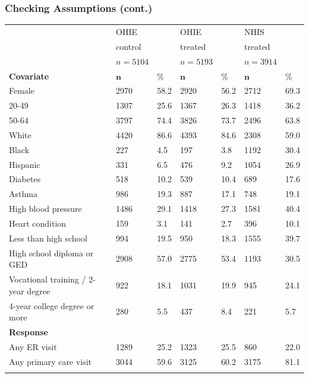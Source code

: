 \documentclass{beamer}
\begin{document}
\begin{frame}
\frametitle{Checking Assumptions (cont.)}
{\scriptsize
\begin{longtable}{lllllll}
  & OHIE &  & OHIE &  & NHIS &  \\ 
    & control &  & treated &  &treated &   \\ 
  & $n=5104$ &  & $n=5193$ &  & $n=3914$ &  \\  
  \hline   
    \hline   
 \textbf{Covariate} &  $\mathbf{n}$ & $\mathbf{\%}$ & $\mathbf{n}$ & $\mathbf{\%}$ & $\mathbf{n}$ & $\mathbf{\%}$ \\ 
\hline
Female & 2970 & 58.2 & 2920 & 56.2 & 2712 & 69.3  \\ 
   \hline
20-49 & 1307 & 25.6 & 1367 & 26.3 & 1418 & 36.2  \\ 
   \hline
50-64 & 3797 & 74.4 & 3826 & 73.7 & 2496 & 63.8 \\ 
   \hline
White & 4420 & 86.6 & 4393 & 84.6 & 2308 & 59.0  \\ 
   \hline
Black & 227 & 4.5 & 197 & 3.8 & 1192 & 30.4  \\ 
   \hline
Hispanic & 331 & 6.5 & 476 & 9.2 & 1054 & 26.9  \\ 
   \hline
Diabetes & 518 & 10.2 & 539 & 10.4 & 689 & 17.6 \\ 
   \hline
Asthma & 986 & 19.3 & 887 & 17.1 & 748 & 19.1  \\ 
   \hline
High blood pressure & 1486 & 29.1 & 1418 & 27.3 & 1581 & 40.4  \\ 
   \hline
Heart condition & 159 & 3.1 & 141 & 2.7 & 396 & 10.1 \\ 
   \hline
Less than high school  & 994 & 19.5 & 950 & 18.3 & 1555 & 39.7  \\ 
   \hline
High school diploma or GED & 2908 & 57.0 & 2775 & 53.4 & 1193 & 30.5 \\ 
   \hline
Vocational training / 2-year degree & 922 & 18.1 & 1031 & 19.9 & 945 & 24.1 \\ 
   \hline
4-year college degree or more & 280 & 5.5 & 437 & 8.4 & 221 & 5.7 \\ 
   \hline
\hline
 \textbf{Response} &   &  &  & &  &  \\ 
Any ER visit & 1289 & 25.2 & 1323 & 25.5 & 860 & 22.0  \\ 
   \hline
\hline
Any primary care visit & 3044 & 59.6 & 3125 & 60.2 & 3175 & 81.1 \\ 
\hline
\hline
\label{rct-nrt-compare}
\end{longtable}
}
\end{frame}
\end{document}
